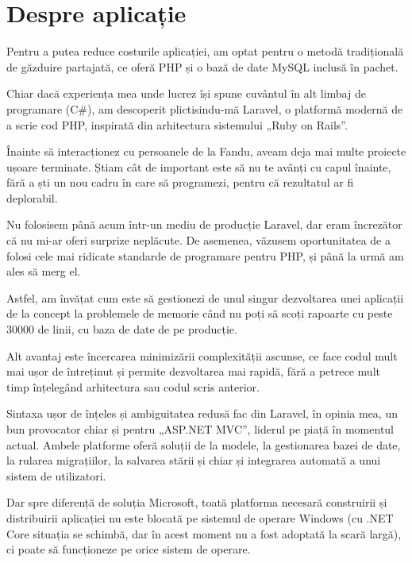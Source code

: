 \section{Despre aplicație}
	Pentru a putea reduce costurile aplicației, am optat pentru o metodă tradițională de găzduire partajată, ce oferă PHP și o bază de date MySQL inclusă în pachet.

	Chiar dacă experiența mea unde lucrez își spune cuvântul în alt limbaj de programare (C\#), am descoperit plictisindu-mă Laravel\cite{laravel}, o platformă modernă de a scrie cod PHP, inspirată din arhitectura sistemului „Ruby on Rails”.

	Înainte să interacționez cu persoanele de la Fandu, aveam deja mai multe proiecte ușoare terminate.
	Știam cât de important este să nu te avânți cu capul înainte, fără a ști un nou cadru în care să programezi, pentru că rezultatul ar fi deplorabil.

	Nu folosisem până acum într-un mediu de producție Laravel, dar eram încrezător că nu mi-ar oferi surprize neplăcute.
	De asemenea, văzusem oportunitatea de a folosi cele mai ridicate standarde de programare pentru PHP, și până la urmă am ales să merg el.

	Astfel, am învățat cum este să gestionezi de unul singur dezvoltarea unei aplicații de la concept la problemele de memorie când nu poți să scoți rapoarte cu peste 30000 de linii, cu baza de date de pe producție.

	Alt avantaj este încercarea minimizării complexității ascunse\cite{laravel_complexity}, ce face codul mult mai ușor de întreținut și permite dezvoltarea mai rapidă, fără a petrece mult timp înțelegând arhitectura sau codul scris anterior.

	Sintaxa ușor de înțeles și ambiguitatea redusă fac din Laravel, în opinia mea, un bun provocator chiar și pentru „ASP.NET MVC”\cite{hotframeworks}, liderul pe piață în momentul actual.
	Ambele platforme oferă soluții de la modele, la gestionarea bazei de date, la rularea migrațiilor, la salvarea stării și chiar și integrarea automată a unui sistem de utilizatori.

	Dar spre diferență de soluția Microsoft, toată platforma necesară construirii și distribuirii aplicației nu este blocată pe sistemul de operare Windows (cu .NET Core situația se schimbă, dar în acest moment nu a fost adoptată la scară largă), ci poate să funcționeze pe orice sistem de operare.
